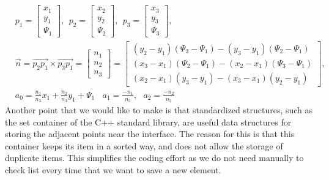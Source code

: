 \documentclass[review]{elsarticle}
\begin{document}
\begin{align}
&p_1=
\begin{bmatrix}
    x_1 \\
    y_1 \\
    \varPsi_1
\end{bmatrix}
,\ \ 
p_2=
\begin{bmatrix}
    x_2 \\
    y_2 \\
    \varPsi_2
\end{bmatrix} 
,\ \ p_3=
\begin{bmatrix}
    x_3 \\
    y_3 \\
    \varPsi_3
\end{bmatrix}, \nonumber\\
&\overrightarrow{n}=\overrightarrow{p_2p_1}\times\overrightarrow{p_3p_1}=
\begin{bmatrix}
    n_1 \\
    n_2 \\
    n_3
\end{bmatrix}=
\begin{bmatrix}
    (y_2-y_1)(\varPsi_3-\varPsi_1)-(y_3-y_1)(\varPsi_2-\varPsi_1) \\
    (x_3-x_1)(\varPsi_2-\varPsi_1)-(x_2-x_1)(\varPsi_3-\varPsi_1) \\
    (x_2-x_1)(y_3-y_1)-(x_3-x_1)(y_2-y_1)
\end{bmatrix},\\
&a_0=\frac{n_1}{n_3}x_1+\frac{n_2}{n_3}y_1+\varPsi_1 \ \ \  \ a_1=\frac{-n_1}{n_3}, \ \ \ a_2=\frac{-n_2}{n_3}
\end{align}
Another point that we would like to make is that standardized structures, such as the set container of the C++ standard library, are useful data structures for storing the 
adjacent points near the interface. The reason for this is that this container keeps its item in a sorted way, and does not allow the storage of duplicate items. 
This simplifies the coding effort as we do not need manually to check list every time that we want to save a new element. 
\end{document}
